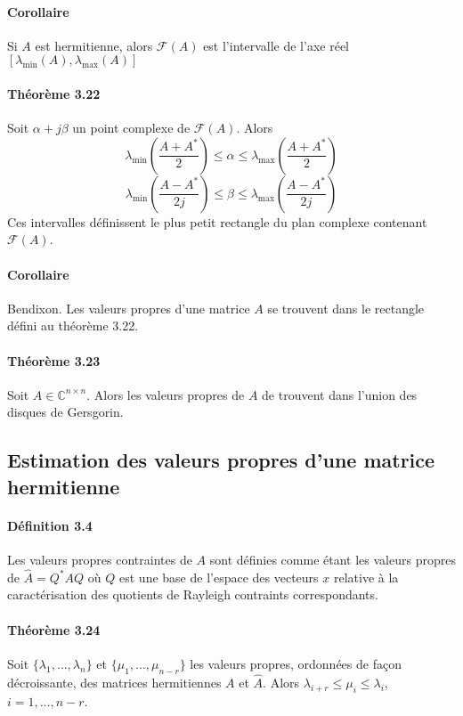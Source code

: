 \paragraph{Corollaire} Si $A$ est hermitienne, alors $\mathcal{F}(A)$ est l'intervalle de l'axe réel $[\lambda_{\text{min}}(A), \lambda_{\text{max}} (A)]$

\paragraph{Théorème 3.22} Soit $\alpha + j \beta$ un point complexe de $\mathcal{F}(A)$. Alors
$$ \lambda_{\text{min}} \left(\frac{A + A^*}{2} \right) \leq \alpha \leq \lambda_{\text{max}} \left( \frac{A+A^*}{2} \right)$$
$$ \lambda_{\text{min}} \left(\frac{A - A^*}{2j} \right) \leq \beta \leq \lambda_{\text{max}} \left( \frac{A-A^*}{2j} \right)$$
Ces intervalles définissent le plus petit rectangle du plan complexe contenant $\mathcal{F}(A)$.

\paragraph{Corollaire} Bendixon. Les valeurs propres d'une matrice $A$ se trouvent dans le rectangle défini au théorème 3.22.

\paragraph{Théorème 3.23} Soit $A \in \mathbb{C}^{n\times n}$. Alors les valeurs propres de $A$ de trouvent dans l'union des disques de Gersgorin.

\subsection{Estimation des valeurs propres d'une matrice hermitienne}

\paragraph{Définition 3.4} Les valeurs propres contraintes de $A$ sont définies comme étant les valeurs propres de $\hat{A} = Q^*AQ$ où $Q$ est une base de l'espace des vecteurs $x$ relative à la caractérisation des quotients de Rayleigh contraints correspondants.

\paragraph{Théorème 3.24} Soit $\{\lambda_1,\dots,\lambda_n\}$ et $\{\mu_1,\dots,\mu_{n-r}\}$ les valeurs propres, ordonnées de façon décroissante, des matrices hermitiennes $A$ et $\hat{A}$. Alors	$ \lambda_{i+r} \leq \mu_i \leq \lambda_i$, $i = 1,\dots,n-r$.

